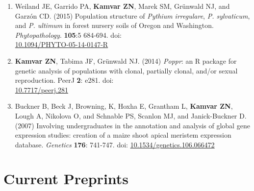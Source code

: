 \begin{enumerate}[leftmargin = 14pt]
	\vspace{3pt}

	\item Weiland JE, Garrido PA, \textbf{Kamvar ZN}, Marek SM, Gr\"unwald NJ, and
	Garz\'on CD. (2015) Population structure of \textit{Pythium irregulare}, \textit{P.
	sylvaticum}, and \textit{P. ultimum} in forest nursery soils of Oregon and
	Washington. \textit{Phytopathology}. \textbf{105}:5 684-694. doi: \\
	\href{http://doi.org/10.1094/PHYTO-05-14-0147-R}{10.1094/PHYTO-05-14-0147-R}

	\vspace{3pt}

    \item \textbf{Kamvar ZN}, Tabima JF, Gr\"unwald NJ. (2014) \textit{Poppr}: an
	R package for genetic analysis of populations with clonal, partially clonal,
	and/or sexual reproduction. PeerJ \textbf{2}: e281. doi: \\
	\href{http://doi.org/10.7717/peerj.281}{10.7717/peerj.281}

	\vspace{3pt}

	\item Buckner B, Beck J, Browning, K, Hoxha E, Grantham L, \textbf{Kamvar
	ZN}, Lough A, Nikolova O, and Schnable PS, Scanlon MJ, and Janick-Buckner D.
	(2007) Involving undergraduates in the annotation and analysis of global
	gene expression studies: creation of a maize shoot apical meristem
	expression database. \textit{Genetics}
	\textbf{176}: 741-747. doi:
	\href{http://doi.org/10.1534/genetics.106.066472}{10.1534/genetics.106.066472}

\end{enumerate}

\section{Current Preprints}

